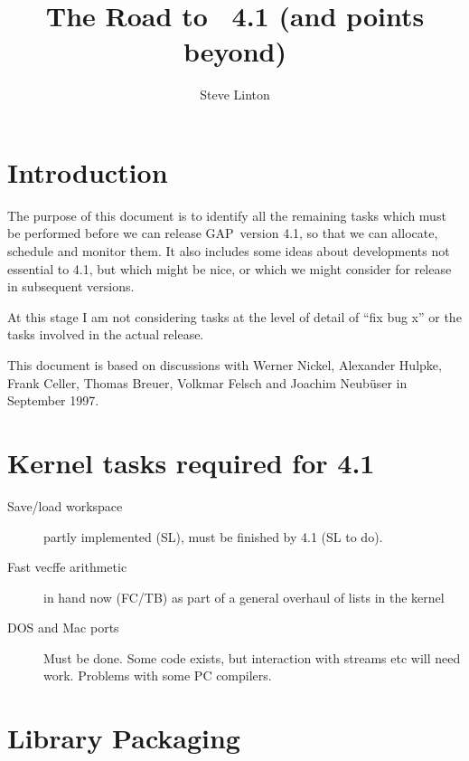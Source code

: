 \documentclass[12pt]{article}
\title{The Road to \GAP\ 4.1 (and points beyond)}
\author{Steve Linton}
\newcommand{\GAP}{\textsf{GAP}}
\newcommand{\bd}{\begin{description}}
\newcommand{\ed}{\end{description}}
\begin{document}
\maketitle
\section{Introduction}

The purpose of this document is to identify all the remaining tasks
which must be performed before we can release \GAP\ version 4.1, so
that we can allocate, schedule and monitor them. It also includes some
ideas about developments not essential to 4.1, but which might be
nice, or which we might consider for release in
subsequent versions.

At this stage I am not considering tasks at the level of detail of
``fix bug x'' or the tasks involved in the actual release.

This document is based on discussions with Werner Nickel, Alexander
Hulpke, Frank Celler, Thomas Breuer, Volkmar Felsch and Joachim
Neub\"user in September 1997.

\section{Kernel tasks required for 4.1}

\bd
\item[Save/load workspace] partly implemented (SL), must be finished by 4.1 (SL to do).
\item[Fast vecffe arithmetic] in hand now (FC/TB) as part of a general overhaul of lists
in the kernel
\item[DOS and Mac ports] Must be done. Some code exists, but
interaction with streams etc will need work. Problems with some PC compilers.
\ed

\section{Library Packaging}
\end{document}
